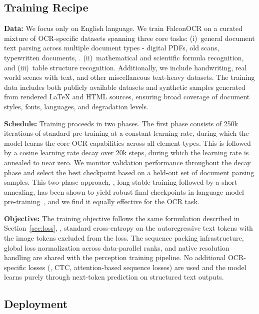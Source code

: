 \subsection{Training Recipe}

\noindent \textbf{Data:} We focus only on English language. We train FalconOCR on a curated mixture of OCR-specific datasets spanning three core tasks: (i)~general document text parsing across multiple document types - digital PDFs, old scans, typewritten documents, \etc. (ii)~mathematical and scientific formula recognition, and (iii)~table structure recognition. Additionally, we include handwriting, real world scenes with text, and other miscellaneous text-heavy datasets. The training data includes both publicly available datasets and synthetic samples generated from rendered \LaTeX{} and HTML sources, ensuring broad coverage of document styles, fonts, languages, and degradation levels.

\noindent \textbf{Schedule:} Training proceeds in two phases. The first phase consists of \num{250}k iterations of standard pre-training at a constant learning rate, during which the model learns the core OCR capabilities across all element types. This is followed by a cosine learning rate decay over \num{20}k steps, during which the learning rate is annealed to near zero. We monitor validation performance throughout the decay phase and select the best checkpoint based on a held-out set of document parsing samples. This two-phase approach, \ie, long stable training followed by a short annealing, has been shown to yield robust final checkpoints in language model pre-training~\citep{hu2024minicpm}, and we find it equally effective for the OCR task.

\noindent \textbf{Objective:} The training objective follows the same formulation described in Section~\ref{sec:loss}, \ie, standard cross-entropy on the autoregressive text tokens with the image tokens excluded from the loss. The sequence packing infrastructure, global loss normalization across data-parallel ranks, and native resolution handling are shared with the perception training pipeline. No additional OCR-specific losses (\eg, CTC, attention-based sequence losses) are used and the model learns purely through next-token prediction on structured text outputs.

\subsection{Deployment}

